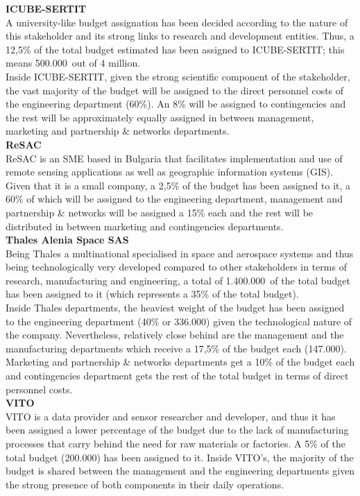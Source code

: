 \textbf{ICUBE-SERTIT}\\

A university-like budget assignation has been decided according to the nature of this stakeholder and its strong links to research and development entities. Thus, a 12,5\% of the total budget estimated has been assigned to ICUBE-SERTIT; this means 500.000\EUR \ out of 4 million.\\

Inside ICUBE-SERTIT, given the strong scientific component of the stakeholder, the vast majority of the budget will be assigned to the direct personnel costs of the engineering department (60\%). An 8\% will be assigned to contingencies and the rest will be approximately equally assigned in between management, marketing and partnership \& networks departments. \\

\textbf{ReSAC}\\

ReSAC is an SME based in Bulgaria that facilitates implementation and use of remote sensing applications as well as geographic information systems (GIS). Given that it is a small company, a 2,5\% of the budget has been assigned to it, a 60\% of which will be assigned to the engineering department, management and partnership \& networks will be assigned a 15\% each and the rest will be distributed in between marketing and contingencies departments. \\

\textbf{Thales Alenia Space SAS}\\

Being Thales a multinational specialised in space and aerospace systems and thus being technologically very developed compared to other stakeholders in terms of research, manufacturing and engineering, a total of 1.400.000\EUR \ of the total budget has been assigned to it (which represents a 35\% of the total budget). \\

Inside Thales departments, the heaviest weight of the budget has been assigned to the engineering department (40\% or 336.000\EUR) given the technological nature of the company. Nevertheless, relatively close behind are the management and the manufacturing departments which receive a 17,5\% of the budget each (147.000\EUR). Marketing and partnership \& networks departments get a 10\% of the budget each and contingencies department gets the rest of the total budget in terms of direct personnel costs.\\
 
\textbf{VITO}\\

VITO is a data provider and sensor researcher and developer, and thus it has been assigned a lower percentage of the budget due to the lack of manufacturing processes that carry behind the need for raw materials or factories. A 5\% of the total budget (200.000\EUR) has been assigned to it. Inside VITO’s, the majority of the budget is shared between the management and the engineering departments given the strong presence of both components in their daily operations.\\

